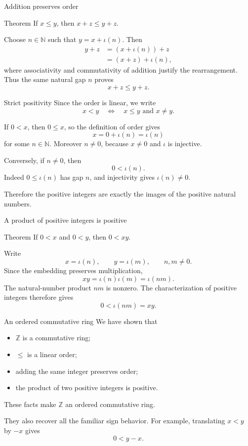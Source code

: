 \documentclass[aspectratio=169,11pt]{beamer}
\newcommand{\N}{\mathbb N}
\newcommand{\Z}{\mathbb Z}
\begin{document}
\begin{frame}{Addition preserves order}
  \begin{block}{Theorem}
    If \(x\le y\), then \(x+z\le y+z\).
  \end{block}

  Choose \(n\in\N\) such that \(y=x+\iota(n)\).  Then
  \begin{align*}
    y+z
      &=(x+\iota(n))+z\\
      &=(x+z)+\iota(n),
  \end{align*}
  where associativity and commutativity of addition justify the rearrangement.
  Thus the same natural gap \(n\) proves
  \[
    x+z\le y+z.
  \]
\end{frame}

\begin{frame}{Strict positivity}
  Since the order is linear, we write
  \[
    x<y
    \quad\Longleftrightarrow\quad
    x\le y\text{ and }x\ne y.
  \]

  If \(0<x\), then \(0\le x\), so the definition of order gives
  \[
    x=0+\iota(n)=\iota(n)
  \]
  for some \(n\in\N\).  Moreover \(n\ne0\), because \(x\ne0\) and \(\iota\)
  is injective.

  Conversely, if \(n\ne0\), then
  \[
    0<\iota(n).
  \]
  Indeed \(0\le\iota(n)\) has gap \(n\), and injectivity gives
  \(\iota(n)\ne0\).

  Therefore the positive integers are exactly the images of the positive
  natural numbers.
\end{frame}

\begin{frame}{A product of positive integers is positive}
  \begin{block}{Theorem}
    If \(0<x\) and \(0<y\), then \(0<xy\).
  \end{block}

  Write
  \[
    x=\iota(n),\qquad y=\iota(m),
    \qquad n,m\ne0.
  \]
  Since the embedding preserves multiplication,
  \[
    xy=\iota(n)\iota(m)=\iota(nm).
  \]
  The natural-number product \(nm\) is nonzero.  The characterization of
  positive integers therefore gives
  \[
    0<\iota(nm)=xy.
  \]
\end{frame}

\begin{frame}{An ordered commutative ring}
  We have shown that
  \begin{itemize}
    \item \(\Z\) is a commutative ring;
    \item \(\le\) is a linear order;
    \item adding the same integer preserves order;
    \item the product of two positive integers is positive.
  \end{itemize}

  These facts make \(\Z\) an \alert{ordered commutative ring}.

  They also recover all the familiar sign behavior.  For example, translating
  \(x<y\) by \(-x\) gives
  \[
    0<y-x.
  \]
\end{frame}
\end{document}
